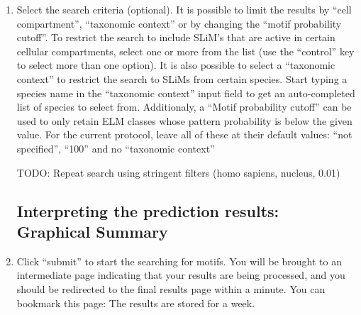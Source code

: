 \begin{enumerate}
\item Select the search criteria (optional). It is possible to limit the
	results by ``cell compartment'', ``taxonomic context'' or by changing
	the ``motif probability cutoff''. To restrict the search to include
	SLiM's that are active in certain cellular compartments, select one or
	more from the list (use the ``control'' key to select more than one
	option). It is also possible to select a ``taxonomic context'' to
	restrict the search to SLiMs from certain species. Start typing a
	species name in the ``taxonomic context'' input field to get an
	auto-completed list of species to select from. Additionaly, a ``Motif
	probability cutoff'' can be used to only retain ELM classes whose
	pattern probability is below the given value. For the current protocol,
	leave all of these at their default values: ``not specified'', ``100''
	and no ``taxonomic context''

TODO: Repeat search using stringent filters (homo sapiens, nucleus,
0.01)

%
%

\subsection{Interpreting the prediction results: Graphical Summary}
\label{subsec:predicting_p53_graphical_summary}

\item Click ``submit'' to start the searching for motifs. You will be brought
	to an intermediate page indicating that your results are being
	processed, and you should be redirected to the final results page
	within a minute. You can bookmark this page: The results are stored for
	a week.



\end{enumerate}
